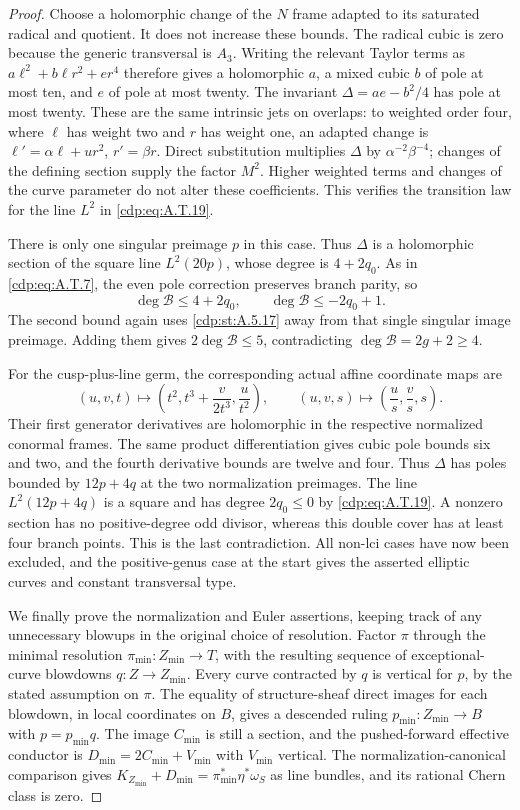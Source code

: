 \begin{proof}
Choose a holomorphic change of the $N$ frame adapted
to its saturated radical and quotient. It does not
increase these bounds. The radical cubic is zero
because the generic transversal is $A_3$.
Writing the relevant Taylor terms as
$a\ell^2+b\ell r^2+er^4$ therefore gives a
holomorphic $a$, a mixed cubic $b$ of pole at most
ten, and $e$ of pole at most twenty. The invariant
$\Delta=ae-b^2/4$ has pole at most twenty.
These are the same intrinsic jets on overlaps:
to weighted order four, where $\ell$ has weight
two and $r$ has weight one, an adapted change is
$\ell'=\alpha\ell+u r^2$, $r'=\beta r$.
Direct substitution multiplies $\Delta$ by
$\alpha^{-2}\beta^{-4}$; changes of the defining
section supply the factor $M^2$. Higher weighted
terms and changes of the curve parameter do not
alter these coefficients. This verifies the
transition law for the line $L^2$ in \eqref{cdp:eq:A.T.19}.

There is only one singular preimage $p$ in this case.
Thus $\Delta$ is a holomorphic section of the square
line $L^2(20p)$, whose degree is $4+2q_0$.
As in \eqref{cdp:eq:A.T.7}, the even pole correction preserves
branch parity, so
\[
 \deg\mathcal B\le4+2q_0,
 \qquad \deg\mathcal B\le-2q_0+1.
\]
The second bound again uses \ref{cdp:st:A.5.17} away from that
single singular image preimage. Adding them gives
$2\deg\mathcal B\le5$, contradicting
$\deg\mathcal B=2g+2\ge4$.

For the cusp-plus-line germ, the corresponding
actual affine coordinate maps are
\[
 (u,v,t)\longmapsto
       \left(t^2,t^3+\frac{v}{2t^3},\frac{u}{t^2}\right),
 \qquad
 (u,v,s)\longmapsto\left(\frac us,\frac vs,s\right).
                                                        \tag{A.T.21}\label{cdp:eq:A.T.21}
\]
Their first generator derivatives are holomorphic
in the respective normalized conormal frames.
The same product differentiation gives cubic pole
bounds six and two, and the fourth derivative bounds
are twelve and four. Thus $\Delta$ has poles bounded
by $12p+4q$ at the two normalization preimages.
The line $L^2(12p+4q)$ is a square and has degree
$2q_0\le0$ by \eqref{cdp:eq:A.T.19}. A nonzero section has no
positive-degree odd divisor, whereas this double
cover has at least four branch points. This is the
last contradiction. All non-lci cases have now
been excluded, and the positive-genus case at the
start gives the asserted elliptic curves and constant
transversal type.

We finally prove the normalization and Euler assertions,
keeping track of any unnecessary blowups in the original
choice of resolution. Factor $\pi$ through the minimal
resolution $\pi_{\min}:Z_{\min}\to T$, with the resulting
sequence of exceptional-curve blowdowns
$q:Z\to Z_{\min}$. Every curve contracted by $q$ is
vertical for $p$, by the stated assumption on $\pi$.
The equality of structure-sheaf direct images for each
blowdown, in local coordinates on $B$, gives a descended
ruling $p_{\min}:Z_{\min}\to B$ with
$p=p_{\min}q$. The image $C_{\min}$ is still a section,
and the pushed-forward effective conductor is
$D_{\min}=2C_{\min}+V_{\min}$ with $V_{\min}$ vertical.
The normalization-canonical comparison gives
$K_{Z_{\min}}+D_{\min}=\pi_{\min}^*\eta^*\omega_S$
as line bundles, and its rational Chern class is zero.


\end{proof}
